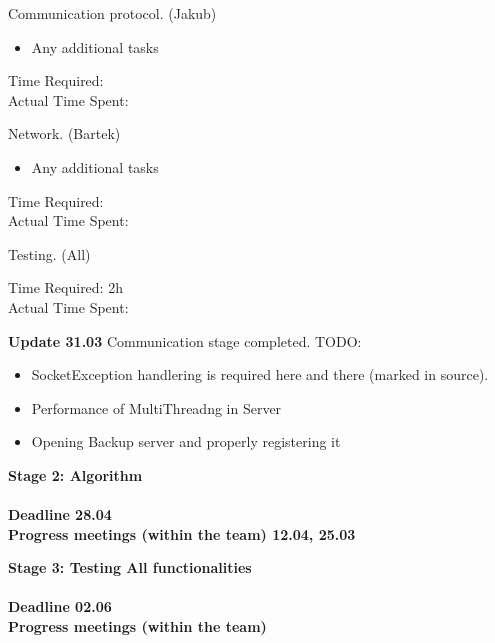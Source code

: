 \documentclass{article}
\begin{document}
\begin{itemize}
\begin{itemize}
\begin{enumerate}
			
					{\bf \item Communication protocol. (Jakub)}
					\begin{itemize} [label=$\bullet$]
							\item Any additional tasks
					\end{itemize}
					Time Required: \\ 
					Actual Time Spent: \\
			
			
					{\bf \item Network. (Bartek) }
					\begin{itemize} [label=$\bullet$]
							\item Any additional tasks
					\end{itemize}
					Time Required: \\ 
					Actual Time Spent: \\
			
			
					{\bf \item Testing. (All) \\}
					Time Required: 2h \\ 
					Actual Time Spent: \\
										
			\end{enumerate}

	\end{itemize}

	{\large \bf	Update 31.03}
	Communication stage completed.
	TODO:
	\begin{itemize}
		\item SocketException handlering is required here and there (marked in source).
		\item Performance of MultiThreadng in Server
		\item Opening Backup server and properly registering it
	\end{itemize}
	
	
	\newpage

{\item \large \bf Stage 2: Algorithm \\ \\
	Deadline 28.04 \\
	Progress meetings (within the team) 12.04, 25.03 \\}


{\item \large \bf Stage 3: Testing All functionalities \\ \\
	Deadline 02.06 \\
	Progress meetings (within the team) \\}


\end{itemize}
\end{document}
